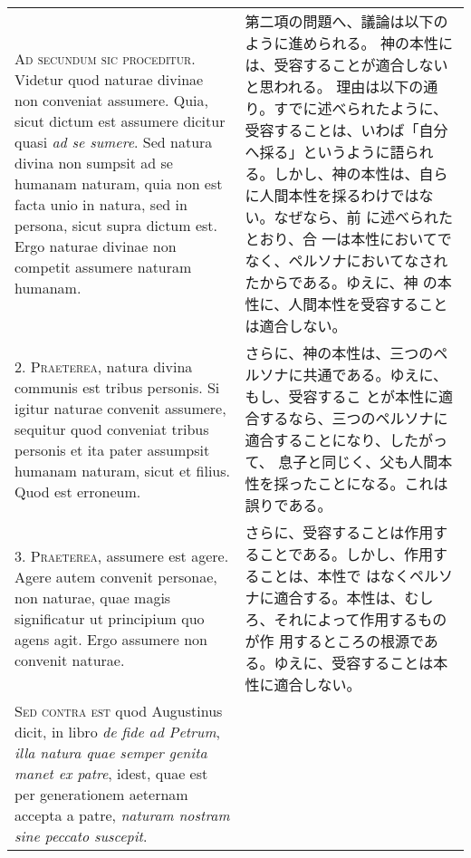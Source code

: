 \documentclass[10pt]{jsarticle} %
\begin{document}
\begin{longtable}{p{21em}p{21em}}

{\Huge A}{\scshape d secundum sic proceditur}. Videtur quod naturae divinae non conveniat
 assumere. Quia, sicut dictum est assumere dicitur quasi {\itshape ad se
 sumere}. Sed natura divina non sumpsit ad se humanam naturam, quia non
 est facta unio in natura, sed in persona, sicut supra dictum est. Ergo
 naturae divinae non competit assumere naturam humanam.

&

第二項の問題へ、議論は以下のように進められる。
神の本性には、受容することが適合しないと思われる。
理由は以下の通り。すでに述べられたように、受容することは、いわば「自分へ採る」というように語られ
 る。しかし、神の本性は、自らに人間本性を採るわけではない。なぜなら、前
 に述べられたとおり、合
 一は本性においてでなく、ペルソナにおいてなされたからである。ゆえに、神
 の本性に、人間本性を受容することは適合しない。

\\



2. {\scshape Praeterea}, natura divina communis est tribus personis. Si igitur naturae
 convenit assumere, sequitur quod conveniat tribus personis et ita pater
 assumpsit humanam naturam, sicut et filius. Quod est erroneum.

&


さらに、神の本性は、三つのペルソナに共通である。ゆえに、もし、受容するこ
 とが本性に適合するなら、三つのペルソナに適合することになり、したがって、
 息子と同じく、父も人間本性を採ったことになる。これは誤りである。

\\



3. {\scshape Praeterea}, assumere est agere. Agere autem convenit personae, non
 naturae, quae magis significatur ut principium quo agens agit. Ergo
 assumere non convenit naturae.


&


さらに、受容することは作用することである。しかし、作用することは、本性で
 はなくペルソナに適合する。本性は、むしろ、それによって作用するものが作
 用するところの根源である。ゆえに、受容することは本性に適合しない。

\\




{\scshape Sed contra est} quod Augustinus dicit, in libro {\itshape de fide ad Petrum}, {\itshape illa
 natura quae semper genita manet ex patre}, idest, quae est per
 generationem aeternam accepta a patre, {\itshape naturam nostram sine peccato
 suscepit}.



\end{longtable}
\end{document}
